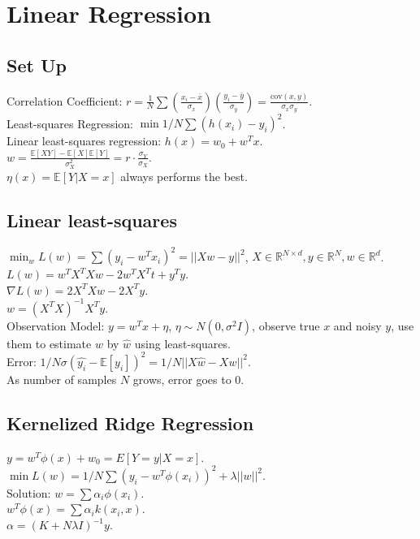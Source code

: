 \section{Linear Regression}

\subsection*{Set Up}

Correlation Coefficient: $r = \frac{1}{N} \sum \left(\frac{x_i-\bar{x}}{\sigma_x}\right)\left(\frac{y_i-\bar{y}}{\sigma_y}\right) = \frac{\text{cov}(x, y)}{\sigma_x \sigma_y}$.\\
Least-squares Regression: $\min 1/N \sum(h(x_i) - y_i)^2$.\\
Linear least-squares regression: $h(x) = w_0+ w^T x$.\\
$w = \frac{\mathbb{E}[XY] - \mathbb{E}[X]\mathbb{E}[Y]}{\sigma_X^2} = r \cdot \frac{\sigma_Y}{\sigma_X}$.\\
$\eta(x) = \mathbb{E}[Y|X = x]$ always performs the best.\\

\subsection*{Linear least-squares}

$\min_w L(w) = \sum (y_i - w^T x_i)^2 = ||X w - y||^2$, $X \in \mathbb{R}^{N \times d}, y \in \mathbb{R}^N, w \in \mathbb{R}^d$.\\
$L(w) = w^T X^T X w - 2 w^T X^T t + y^T y$.\\
$\nabla L(w) = 2 X^T X w - 2 X^T y$.\\
$w = (X^T X)^{-1} X^T y$.\\
Observation Model: $y = w^T x + \eta$, $\eta \sim N(0, \sigma^2 I)$, observe true $x$ and noisy $y$, use them to estimate $w$ by $\hat{w}$ using least-squares.\\
Error: $1/N \sigma(\hat{y_i} - \mathbb{E}[y_i])^2 = 1/N ||X\hat{w} - Xw||^2$.\\
As number of samples $N$ grows, error goes to 0.

\subsection*{Kernelized Ridge Regression}

$y = w^T \phi(x) + w_0 = E[Y=y | X=x]$.\\
$\min L(w) = 1/N \sum(y_i - w^T \phi(x_i))^2 + \lambda ||w||^2$.\\
Solution: $w = \sum \alpha_i \phi(x_i)$.\\
$w^T \phi(x) = \sum \alpha_i k(x_i, x)$.\\
$\alpha = (K + N \lambda I)^{-1}y$.

